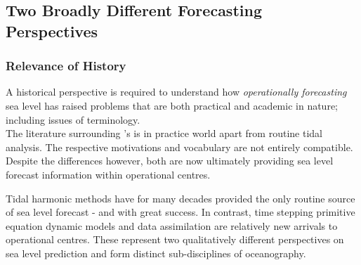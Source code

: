 \subsection{Two Broadly Different Forecasting Perspectives} 
\label{S:two_perspectives}
\subsubsection{Relevance of History}
A historical perspective is required to understand how \emph{operationally forecasting} sea level has raised problems that are both practical and academic in nature; including issues of terminology.\\
The literature surrounding \OGCM{}'s is in practice world apart from routine tidal analysis.  The respective motivations and vocabulary are not entirely compatible.  Despite the differences however, both are now ultimately providing sea level forecast information within operational centres.  




Tidal harmonic methods have for many decades provided the only routine source of sea level forecast - and with great success.  In contrast, time stepping primitive equation dynamic models and data assimilation are relatively new arrivals to operational centres.  These represent two qualitatively different perspectives on sea level prediction and form distinct sub-disciplines of oceanography.\\


